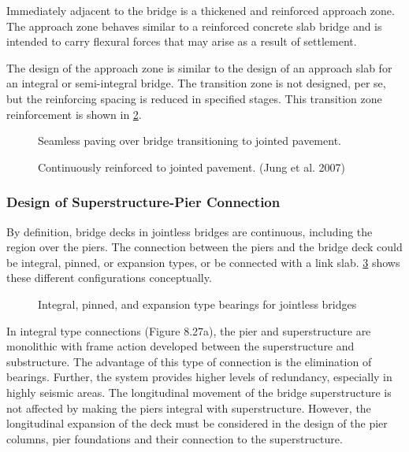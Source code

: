 Immediately adjacent to the bridge is a thickened and reinforced approach zone. The approach zone behaves
similar to a reinforced concrete slab bridge and is intended to carry flexural forces that may arise as a result of
settlement.

The design of the approach zone is similar to the design of an approach slab for an integral or semi-integral
bridge. The transition zone is not designed, per se, but the reinforcing spacing is reduced in specified stages. This
transition zone reinforcement is shown in \cref{fig:continuously-reinforced-jointed-pverment}.

\begin{figure}
  \caption{Seamless paving over bridge transitioning to jointed pavement.}
  \label{fig:seamless-paving}
\end{figure}

\begin{figure}
  \caption{Continuously reinforced to jointed pavement. (Jung et al. 2007)}
  \label{fig:continuously-reinforced-jointed-pverment}
\end{figure}

\subsubsection{Design of Superstructure-Pier Connection}
By definition, bridge decks in jointless bridges are continuous, including the region over the piers. The connection between the piers and the bridge deck could be integral, pinned, or expansion types, or be connected with a link slab. \cref{fig:bearing-jointless-bridges} shows these different configurations conceptually.

\begin{figure}
  \caption{Integral, pinned, and expansion type bearings for jointless bridges}
  \label{fig:bearing-jointless-bridges}
\end{figure}

In integral type connections (Figure 8.27a), the pier and superstructure are monolithic with frame action developed between the superstructure and substructure. The advantage of this type of connection is the elimination of bearings. Further, the system provides higher levels of redundancy, especially in highly seismic areas. The longitudinal movement of the bridge superstructure is not affected by making the piers integral with superstructure. However, the longitudinal expansion of the deck must be considered in the design of the pier columns, pier foundations and their connection to the superstructure.

